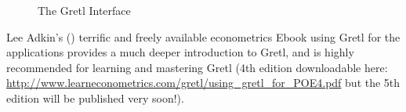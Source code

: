 \documentclass[11pt]{article}
\begin{document}
\begin{figure}[h!]
	\centering
	
	
	\caption{The Gretl Interface}
	\label{fig:GUI}
\end{figure}


Lee Adkin's (\citeyear{Adkins2014}) terrific and freely available econometrics Ebook using Gretl for the applications provides a much deeper introduction to Gretl, and is highly recommended for learning and mastering Gretl (4th edition downloadable here: \url{http://www.learneconometrics.com/gretl/using_gretl_for_POE4.pdf} but the 5th edition will be published very soon!). 
\end{document}
